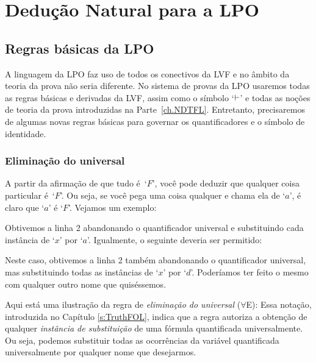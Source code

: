 \part{Dedução Natural para a LPO}
\label{ch.NDFOL}

 

\chapter{Regras básicas da LPO}\label{s:BasicFOL}

A linguagem da LPO faz uso de todos os conectivos da LVF e no âmbito da teoria da prova não seria diferente. No sistema de provas da LPO usaremos todas as regras básicas e derivadas da LVF, assim como o símbolo `$\vdash$' e todas as noções de teoria da prova introduzidas na Parte~\ref{ch.NDTFL}. Entretanto, precisaremos de algumas novas regras básicas para governar os quantificadores e o símbolo de identidade. 

 
\section{Eliminação do universal}

A partir da afirmação de que tudo é~`$F$', você pode deduzir que qualquer coisa particular é~`$F$’.  Ou seja, se você pega uma coisa qualquer e chama ela de `$a$', é claro que `$a$' é `$F$'.
Vejamos um exemplo:
\begin{fitchproof}
	 
\end{fitchproof}
 Obtivemos a linha 2 abandonando o quantificador universal e substituindo cada instância de `$x$' por `$a$'. Igualmente, o seguinte deveria ser permitido:
\begin{fitchproof}
	 
\end{fitchproof}
 
Neste caso, obtivemos a linha 2 também abandonando o quantificador universal, mas substituindo todas as instâncias de `$x$' por `$d$'. Poderíamos ter feito o mesmo com qualquer outro nome que quiséssemos.

Aqui está uma ilustração da regra de \textit{eliminação do universal} ($\forall$E):
Essa notação, introduzida no Capítulo  \ref{s:TruthFOL}, indica que a regra autoriza a obtenção de qualquer \emph{instância de substituição} de uma fórmula quantificada universalmente. Ou seja, podemos substituir todas as ocorrências da variável quantificada universalmente por qualquer nome que desejarmos.

